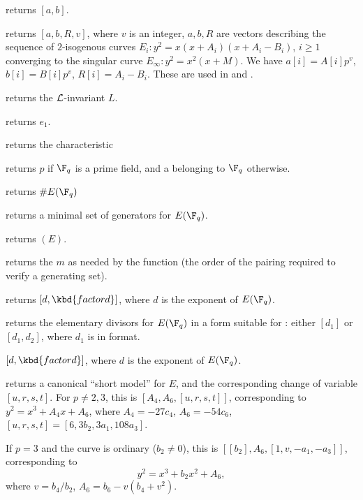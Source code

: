  returns $[a,b]$.

 returns $[a,b,R,v]$, where
$v$ is an integer, $a, b, R$ are vectors describing the sequence of
$2$-isogenous curves $E_i: y^2 = x(x+A_i)(x+A_i-B_i)$, $i \geq 1$
converging to the singular curve $E_\infty: y^2 = x^2(x+M)$. We have
$a[i] = A[i] p^v$, $b[i] = B[i] p^v$, $R[i] = A_i - B_i$. These are used in
 and .

 returns the ${\cal L}$-invariant $L$.

 returns $e_1$.


 returns the characteristic

 returns $p$ if $\F_q$ is a prime field, and
a  belonging to $\F_q$ otherwise.

 returns $\#E(\F_q)$

 returns a minimal set of generators for
$E(\F_q)$.

 returns $(E)$.

 returns the  $m$ as needed by the
 function (the order of the pairing required to verify a
generating set).

 returns $[d, \kbd{factor{d}}]$, where $d$ is
the exponent of $E(\F_q)$.

 returns the elementary divisors for $E(\F_q)$
in a form suitable for : either $[d_1]$ or $[d_1,d_2]$,
where $d_1$ is in  format.

$[d, \kbd{factor{d}}]$, where $d$ is
the exponent of $E(\F_q)$.

 returns a canonical ``short model'' for $E$,
and the corresponding change of variable $[u,r,s,t]$. For $p\neq 2,3$,
this is $[A_4,A_6,[u,r,s,t]]$, corresponding to $y^2 = x^3 + A_4x + A_6$,
where $A_4 = -27c_4$, $A_6 = -54c_6$, $[u,r,s,t] = [6, 3b_2,3a_1,108a_3]$.

\item If $p = 3$ and the curve is ordinary ($b_2\neq 0$), this is
$[[b_2], A_6, [1,v,-a_1,-a_3]]$, corresponding to
$$y^2 = x^3 + b_2 x^2 + A_6,$$
where $v = b_4/b_2$, $A_6 = b_6 - v(b_4+v^2)$.

